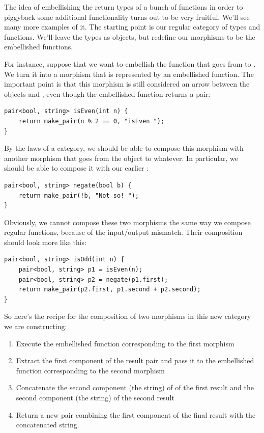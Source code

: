 The idea of embellishing the return types of a bunch of functions in
order to piggyback some additional functionality turns out to be very
fruitful. We'll see many more examples of it. The starting point is our
regular category of types and functions. We'll leave the types as
objects, but redefine our morphisms to be the embellished functions.

For instance, suppose that we want to embellish the function
 that goes from  to . We turn it
into a morphism that is represented by an embellished function. The
important point is that this morphism is still considered an arrow
between the objects  and , even though the
embellished function returns a pair:

\begin{verbatim}
pair<bool, string> isEven(int n) {
    return make_pair(n % 2 == 0, "isEven ");
}
\end{verbatim}

By the laws of a category, we should be able to compose this morphism
with another morphism that goes from the object  to
whatever. In particular, we should be able to compose it with our
earlier :

\begin{verbatim}
pair<bool, string> negate(bool b) {
    return make_pair(!b, "Not so! ");
}
\end{verbatim}

Obviously, we cannot compose these two morphisms the same way we compose
regular functions, because of the input/output mismatch. Their
composition should look more like this:

\begin{verbatim}
pair<bool, string> isOdd(int n) {
    pair<bool, string> p1 = isEven(n);
    pair<bool, string> p2 = negate(p1.first);
    return make_pair(p2.first, p1.second + p2.second);
}
\end{verbatim}

So here's the recipe for the composition of two morphisms in this new
category we are constructing:

\begin{enumerate}
\tightlist
\item
  Execute the embellished function corresponding to the first morphism
\item
  Extract the first component of the result pair and pass it to the
  embellished function corresponding to the second morphism
\item
  Concatenate the second component (the string) of of the first result
  and the second component (the string) of the second result
\item
  Return a new pair combining the first component of the final result
  with the concatenated string.
\end{enumerate}

